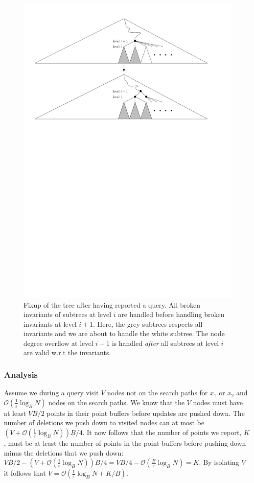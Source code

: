 \documentclass[twoside,11pt,openright]{report}
\def \epsilon {\varepsilon}
\begin{document}
\begin{figure}
\centering
\includegraphics[width=\textwidth]{../figures/gerth_fixup}
\caption{Fixup of the tree after having reported a query. All broken invariants of subtrees at level $i$ are handled before handling broken invariants at level $i + 1$. Here, the grey subtrees respects all invariants and we are about to handle the white subtree. The node degree overflow at level $i + 1$ is handled \textit{after} all subtrees at level $i$ are valid w.r.t the invariants. }
\label{fig:gerth_fixup}
\end{figure}

\subsubsection*{Analysis}

Assume we during a query visit $V$ nodes not on the search paths for $x_1$ or $x_2$ and $\mathcal{O}(\frac{1}{\epsilon}\log_B N)$ nodes on the search paths. We know that the $V$ nodes must have at least $VB/2$ points in their point buffers before updates are pushed down. The number of deletions we push down to visited nodes can at most be $(V + \mathcal{O}(\frac{1}{\epsilon}\log_B N))B/4$. It now follows that the number of points we report, $K$, must be at least the number of points in the point buffers before pushing down minus the deletions that we push down: $VB/2 - (V + \mathcal{O}(\frac{1}{\epsilon}\log_B N))B/4 = VB/4 - \mathcal{O}(\frac{B}{\epsilon}\log_B N) = K$. By isolating $V$ it follows that $V = \mathcal{O}(\frac{1}{\epsilon}\log_B N + K/B)$.
\end{document}
